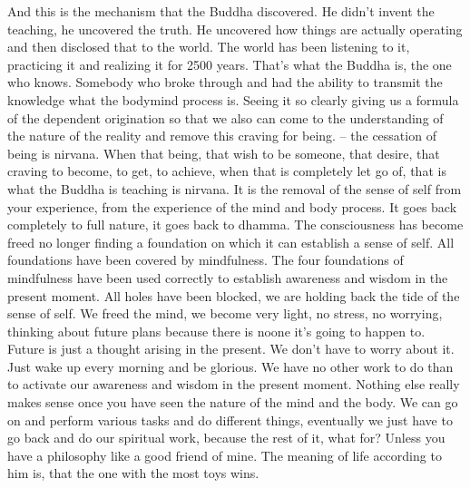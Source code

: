 \documentclass[letterpaper,10pt,english]{sphinxmanual}
\begin{document}
\sphinxAtStartPar
And this is the mechanism that the Buddha discovered. He didn’t invent
the teaching, he uncovered the truth. He uncovered how things are actually
operating and then disclosed that to the world. The world has been listening
to it, practicing it and realizing it for 2500 years. That’s what the Buddha
is, the one who knows. Somebody who broke through and had the ability to
transmit the knowledge what the body\sphinxhyphen{}mind process is. Seeing it so clearly
giving us a formula of the dependent origination so that we also can come
to the understanding of the nature of the reality and remove this craving for
being.
– the cessation of being is nirvana. When that
being, that wish to be someone, that desire, that craving to become, to get, to
achieve, when that is completely let go of, that is what the Buddha is teaching is nirvana. It is the removal of the sense of self from your experience,
from the experience of the mind and body process. It goes back completely
to full nature, it goes back to dhamma. The consciousness has become freed
no  longer  finding  a  foundation  on  which  it  can  establish  a  sense  of  self.
All foundations have been covered by mindfulness. The four foundations of
mindfulness have been used correctly to establish awareness and wisdom in
the present moment. All holes have been blocked, we are holding back the
tide of the sense of self. We freed the mind, we become very light, no stress,
no worrying, thinking about future plans because there is no\sphinxhyphen{}one it’s going
to happen to. Future is just a thought arising in the present. We don’t have
to worry about it. Just wake up every morning and be glorious. We have no
other work to do than to activate our awareness and wisdom in the present
moment. Nothing else really makes sense once you have seen the nature of
the mind and the body. We can go on and perform various tasks and do different things, eventually we just have to go back and do our spiritual work,
because the rest of it, what for? Unless you have a philosophy like a good
friend of mine. The meaning of life according to him is, that the one with the
most toys wins.
\end{document}
